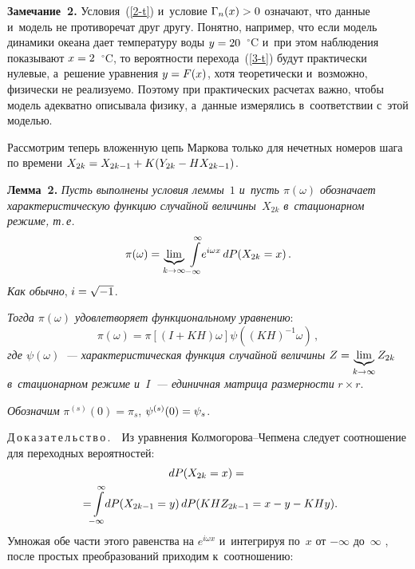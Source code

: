 \begin{multicols}{2}
\smallskip

\noindent
\textbf{Замечание~2.} Условия~(\ref{2-t}) и~условие $\Gamma_n(x)\hm>0 $
означают, что данные и~модель не противоречат друг другу. Понятно, например,
что если модель динамики океана дает температуру воды $y\hm=20$~$^\circ$C
и~при этом наблюдения показывают $x\hm=2$~$^\circ$C, то вероятности
перехода~(\ref{3-t}) будут практически нулевые, а~решение уравнения $y\hm=F(x)$,
хотя теоретически и~возможно, физически не реализуемо. Поэтому при практических расчетах важно, чтобы модель адекватно описывала физику, а~данные измерялись в~соответствии с~этой моделью.	

\smallskip

Рассмотрим теперь вложенную цепь Маркова только для нечетных номеров шага
по времени $X_{2k}\hm=X_{2k-1}\hm+K(Y_{2k}\hm-HX_{2k-1})$.

\smallskip

\noindent
\textbf{Лемма~2.} \textit{Пусть выполнены условия леммы~$1$ и~пусть
$\pi(\omega)$ обозначает характеристическую функцию случайной величины~$X_{2k}$
в~стационарном режиме, т.\,е.}
$$
\pi(\omega)=\underbrace{\lim}_{k\rightarrow \infty}
\int\limits^\infty_{-\infty}\!\!e^{i \omega x}\, dP(X_{2k}\hm=x)\,.
$$ \textit{Как обычно}, $i\hm=\sqrt{-1}$.

\textit{Тогда $\pi(\omega)$ удовлетворяет функциональному уравнению}:
\begin{equation}
\pi(\omega)=\pi[(I+KH)\omega]\psi ((KH)^{-1} \omega)\,,
\label{4-t}
\end{equation}
\textit{где $\psi (\omega)$~--- характеристическая функция случайной величины  $Z\hm=\underbrace{\lim}_{k\rightarrow \infty}Z_{2k}$ в~стационарном режиме и~$I$~--- единичная матрица размерности} $r\times r$.

\textit{Обозначим} $\pi^{(s)}(0)=\pi_s$, $\psi^{(s)}(0)\hm=\psi_s$.

\smallskip

\noindent
 Д\,о\,к\,а\,з\,а\,т\,е\,л\,ь\,с\,т\,в\,о\,.\ \
 Из уравнения Кол\-мо\-го\-ро\-ва--Чеп\-ме\-на следует соотношение
 для переходных вероятностей:
\begin{multline*}
dP(X_{2k}=x)={}\\
{}=\!\!\int\limits^\infty_{-\infty}\!\!
dP(X_{2k-1}=y)\,dP(KHZ_{2k-1}=x-y-KHy).\hspace*{-1.2pt}
\end{multline*}
Умножая обе части этого равенства на $e^{i \omega x}$ и~интегрируя
по~$x$ от $-\infty$ до~$\infty$ , после простых преобразований приходим к~соотношению:


\end{multicols}
